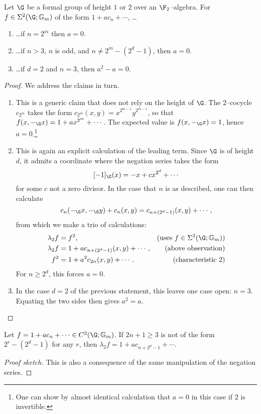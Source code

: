 \begin{lemma}\label{SigmaNonexistenceLemma}
Let $\G$ be a formal group of height $1$ or $2$ over an $\F_2$--algebra.  For $f \in \Sigma^2(\G; \Gm)$ of the form $1 + a c_n + \cdots$, \ldots
\begin{enumerate}
    \item \ldots if $n = 2^m$ then $a = 0$.
    \item \ldots if $n > 3$, $n$ is odd, and $n \ne 2^m - (2^d - 1)$, then $a = 0$.
    \item \ldots if $d = 2$ and $n = 3$, then $a^2 - a = 0$.
\end{enumerate}
\end{lemma}
\begin{proof}
We address the claims in turn.
\begin{enumerate}
    \item This is a generic claim that does not rely on the height of $\G$.  The $2$--cocycle $c_{2^m}$ takes the form $c_{2^m}(x, y) = x^{2^{m-1}} y^{2^{m-1}}$, so that $f(x, -_{\G} x) = 1 + a x^{2^m} + \cdots$.  The expected value is $f(x, -_{\G} x) = 1$, hence $a = 0$.\footnote{One can show by almost identical calculation that $a = 0$ in this case if $2$ is invertible.}
    \item This is again an explicit calculation of the leading term.  Since $\G$ is of height $d$, it admits a coordinate where the negation series takes the form \[[-1]_{\G}(x) = -x + cx^{2^d} + \cdots\] for some $c$ not a zero divisor.  In the case that $n$ is as described, one can then calculate \[c_n(-_{\G} x, -_{\G} y) + c_n(x, y) = c_{n + (2^d-1)}(x, y) + \cdots,\] from which we make a trio of calculations:
    \begin{align*}
    \lambda_2 f & = f^2, & \text{(uses $f \in \Sigma^2(\G; \Gm)$)} \\
    \lambda_2 f & = 1 + ac_{n + (2^d-1)}(x, y) + \cdots, & \text{(above observation)} \\
    f^2 & = 1 + a^2 c_{2n}(x, y) + \cdots. & \text{(characteristic $2$)}
    \end{align*}
    For $n \ge 2^d$, this forces $a = 0$.
    \item In the case $d = 2$ of the previous statement, this leaves one case open: $n = 3$.  Equating the two sides then gives $a^2 = a$.
    \qedhere
\end{enumerate}
\end{proof}

\begin{lemma}\label{SigmaArrowLemma}
Let $f = 1 + a c_n + \cdots \in C^2(\G; \Gm)$.  If $2n+1 \ge 3$ is not of the form $2^r - (2^d - 1)$ for any $r$, then $\lambda_2 f = 1 + a c_{n + 2^d - 1} + \cdots$.
\end{lemma}
\begin{proof}[Proof sketch]
This is also a consequence of the same manipulation of the negation series.
\end{proof}


